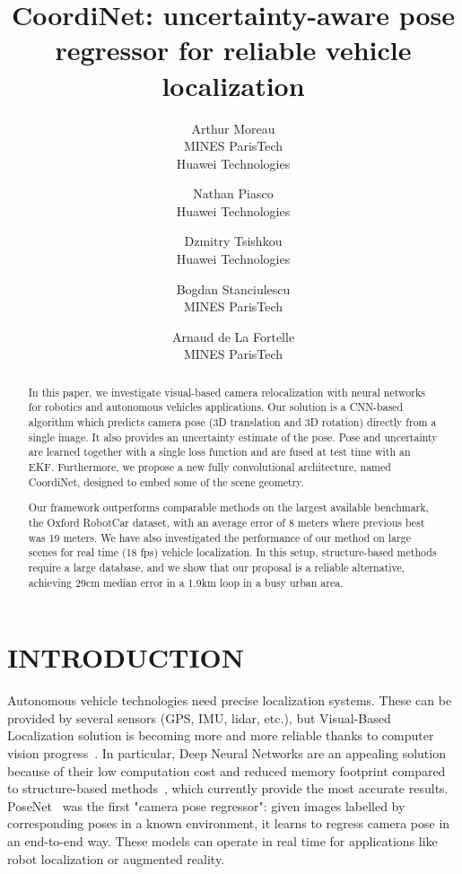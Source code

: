 \documentclass[10pt,twocolumn,letterpaper]{article}
\begin{document}
\title{CoordiNet: uncertainty-aware pose regressor for reliable vehicle localization}

\author{Arthur Moreau\\
MINES ParisTech\\
Huawei Technologies\\
\and
Nathan Piasco\\
Huawei Technologies\\
\and
Dzmitry Tsishkou\\
Huawei Technologies\\
\and
Bogdan Stanciulescu\\
MINES ParisTech\\
\and
Arnaud de La Fortelle\\
MINES ParisTech\\
}

\maketitle


\begin{abstract}
    In this paper, we investigate visual-based camera relocalization with neural networks for robotics and autonomous vehicles applications. Our solution is a CNN-based algorithm which predicts camera pose (3D translation and 3D rotation) directly from a single image. It also provides an uncertainty estimate of the pose. Pose and uncertainty are learned together with a single loss function and are fused at test time with an EKF. Furthermore, we propose a new fully convolutional architecture, named CoordiNet, designed to embed some of the scene geometry. 

    Our framework outperforms comparable methods on the largest available benchmark, the Oxford RobotCar dataset, with an average error of 8 meters where previous best was 19 meters. We have also investigated the performance of our method on large scenes for real time (18 fps) vehicle localization. In this setup, structure-based methods require a large database, and we show that our proposal is a reliable alternative, achieving 29cm median error in a 1.9km loop in a busy urban area.
\end{abstract}

\section{INTRODUCTION}

Autonomous vehicle technologies need precise localization systems. These can be provided by several sensors (GPS, IMU, lidar, etc.), but Visual-Based Localization solution is becoming more and more reliable thanks to computer vision progress~\cite{piasco2018survey}. In particular, Deep Neural Networks are an appealing solution because of their low computation cost and reduced memory footprint compared to structure-based methods~\cite{Toft2020}, which currently provide the most accurate results. PoseNet~\cite{PoseNet} was the first "camera pose regressor": given images labelled by corresponding poses in a known environment, it learns to regress camera pose in an end-to-end way. These models can operate in real time for applications like robot localization or augmented reality.
\end{document}
